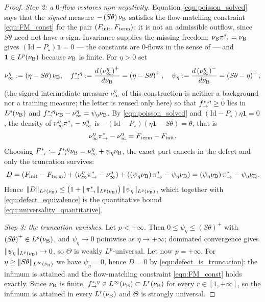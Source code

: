 \begin{proof}
\emph{Step 2: a $0$-flow restores non-negativity.} Equation \eqref{equ:poisson_solved} says that the \emph{signed} measure $-\left(S\theta\right)\nu_{\mathrm{B}}$ satisfies the flow-matching constraint \eqref{equ:FM_const} for the pair $(F_{\mathrm{init}},F_{\mathrm{term}})$; it is not an admissible outflow, since $S\theta$ need not have a sign. Invariance supplies the missing freedom: $\nu_{\mathrm{B}}\pi_{\rightarrow}^* = \nu_{\mathrm{B}}$ gives $\left(\mathrm{Id}-P_\star\right)\mathbf 1 = 0$ --- the constants are $0$-flows in the sense of \citet{brunswic2024theory} --- and $\mathbf 1\in L^p(\nu_{\mathrm{B}})$ because $\nu_{\mathrm{B}}$ is finite. For $\eta>0$ set
\begin{equation}
    \nu^\eta_\infty := \left(\eta-S\theta\right)\nu_{\mathrm{B}},\quad f^{*,\eta}_{\rightarrow} := \frac{d\left(\nu^\eta_\infty\right)^+}{d\nu_{\mathrm{B}}} = \left(\eta-S\theta\right)^+,\quad \psi_\eta := \frac{d\left(\nu^\eta_\infty\right)^-}{d\nu_{\mathrm{B}}} = \left(S\theta-\eta\right)^+,
\end{equation}
(the signed intermediate measure $\nu^\eta_\infty$ of this construction is neither a background nor a training measure; the letter is reused only here) so that $f^{*,\eta}_{\rightarrow}\geq0$ lies in $L^p(\nu_{\mathrm{B}})$ and $f^{*,\eta}_{\rightarrow}\nu_{\mathrm{B}}-\nu^\eta_\infty = \psi_\eta\nu_{\mathrm{B}}$. By \eqref{equ:poisson_solved} and $\left(\mathrm{Id}-P_\star\right)\eta\mathbf 1 = 0$, the density of $\nu^\eta_\infty\pi_{\rightarrow}^*-\nu^\eta_\infty$ is $-\left(\mathrm{Id}-P_\star\right)\left(\eta\mathbf 1-S\theta\right) = \theta$, that is
\begin{equation}
    \nu^\eta_\infty\pi_{\rightarrow}^*-\nu^\eta_\infty = F_{\mathrm{term}}-F_{\mathrm{init}} .
\end{equation}
Choosing $F^*_{\rightarrow} := f^{*,\eta}_{\rightarrow}\nu_{\mathrm{B}} = \nu^\eta_\infty+\psi_\eta\nu_{\mathrm{B}}$, the exact part cancels in the defect and only the truncation survives:
\begin{equation}\label{equ:defect_is_truncation}
    D = \left(F_{\mathrm{init}}-F_{\mathrm{term}}\right)+\left(\nu^\eta_\infty\pi_{\rightarrow}^*-\nu^\eta_\infty\right)+\left(\left(\psi_\eta\nu_{\mathrm{B}}\right)\pi_{\rightarrow}^*-\psi_\eta\nu_{\mathrm{B}}\right) = \left(\psi_\eta\nu_{\mathrm{B}}\right)\pi_{\rightarrow}^*-\psi_\eta\nu_{\mathrm{B}} .
\end{equation}
Hence $\|D\|_{L^p(\nu_{\mathrm{B}})}\leq\left(1+\|\pi_{\rightarrow}^*\|_{L^p(\nu_{\mathrm{B}})}\right)\|\psi_\eta\|_{L^p(\nu_{\mathrm{B}})}$, which together with \eqref{equ:defect_equivalence} is the quantitative bound \eqref{equ:universality_quantitative}.

\emph{Step 3: the truncation vanishes.} Let $p<+\infty$. Then $0\leq\psi_\eta\leq\left(S\theta\right)^+$ with $\left(S\theta\right)^+\in L^p(\nu_{\mathrm{B}})$, and $\psi_\eta\rightarrow0$ pointwise as $\eta\rightarrow+\infty$; dominated convergence gives $\|\psi_\eta\|_{L^p(\nu_{\mathrm{B}})}\rightarrow0$, so $\Theta$ is weakly $L^p$-universal. Let now $p=+\infty$. For $\eta\geq\|S\theta\|_{L^\infty(\nu_{\mathrm{B}})}$ we have $\psi_\eta = 0$, hence $D=0$ by \eqref{equ:defect_is_truncation}: the infimum is attained and the flow-matching constraint \eqref{equ:FM_const} holds exactly. Since $\nu_{\mathrm{B}}$ is finite, $f^{*,\eta}_{\rightarrow}\in L^\infty(\nu_{\mathrm{B}})\subset L^r(\nu_{\mathrm{B}})$ for every $r\in[1,+\infty]$, so the infimum is attained in every $L^r(\nu_{\mathrm{B}})$ and $\Theta$ is strongly universal.
\end{proof}

